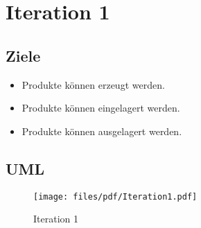 \section{Iteration 1}

\subsection{Ziele}

\begin{itemize}
  \item Produkte können erzeugt werden.
  \item Produkte können eingelagert werden.
  \item Produkte können ausgelagert werden.
\end{itemize}

\subsection{UML}

\begin{figure}
	\centering
		\texttt{[image: files/pdf/Iteration1.pdf]}
	\caption{Iteration 1}
	\label{fig:Iteration1}
\end{figure}
